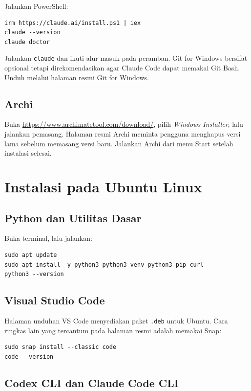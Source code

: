 Jalankan PowerShell:

\begin{lstlisting}
irm https://claude.ai/install.ps1 | iex
claude --version
claude doctor
\end{lstlisting}

Jalankan \texttt{claude} dan ikuti alur masuk pada peramban. Git for Windows
bersifat opsional tetapi direkomendasikan agar Claude Code dapat memakai Git
Bash. Unduh melalui
\href{https://git-scm.com/download/win}{halaman resmi Git for Windows}.

\subsection{Archi}

Buka \url{https://www.archimatetool.com/download/}, pilih \emph{Windows
Installer}, lalu jalankan pemasang. Halaman resmi Archi meminta pengguna
menghapus versi lama sebelum memasang versi baru. Jalankan Archi dari menu
Start setelah instalasi selesai.

\section{Instalasi pada Ubuntu Linux}

\subsection{Python dan Utilitas Dasar}

Buka terminal, lalu jalankan:

\begin{lstlisting}
sudo apt update
sudo apt install -y python3 python3-venv python3-pip curl
python3 --version
\end{lstlisting}

\subsection{Visual Studio Code}

Halaman unduhan VS Code menyediakan paket \texttt{.deb} untuk Ubuntu. Cara
ringkas lain yang tercantum pada halaman resmi adalah memakai Snap:

\begin{lstlisting}
sudo snap install --classic code
code --version
\end{lstlisting}

\subsection{Codex CLI dan Claude Code CLI}

